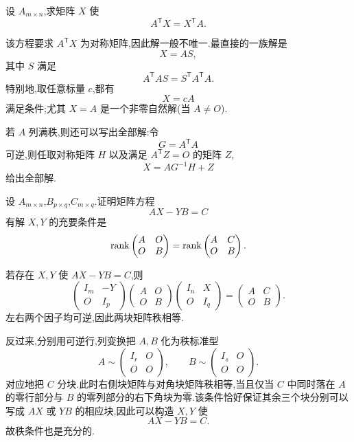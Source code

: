 \begin{example}
设 $A_{m\times n}$,求矩阵 $X$ 使
\[
A^{\mathsf T}X=X^{\mathsf T}A.
\]
\end{example}
\exampleblank

\begin{solution}
该方程要求 $A^{\mathsf T}X$ 为对称矩阵,因此解一般不唯一.最直接的一族解是
\[
\boxed{X=AS},
\]
其中 $S$ 满足
\[
A^{\mathsf T}AS=S^{\mathsf T}A^{\mathsf T}A.
\]
特别地,取任意标量 $c$,都有
\[
\boxed{X=cA}
\]
满足条件;尤其 $X=A$ 是一个非零自然解(当 $A\neq O$).

若 $A$ 列满秩,则还可以写出全部解:令
\[
G=A^{\mathsf T}A
\]
可逆,则任取对称矩阵 $H$ 以及满足 $A^{\mathsf T}Z=O$ 的矩阵 $Z$,
\[
\boxed{X=AG^{-1}H+Z}
\]
给出全部解.
\end{solution}

\begin{example}
设 $A_{m\times n}$,$B_{p\times q}$,$C_{m\times q}$.证明矩阵方程
\[
AX-YB=C
\]
有解 $X,Y$ 的充要条件是
\[
\operatorname{rank}
\begin{pmatrix}A&O\\O&B\end{pmatrix}
=
\operatorname{rank}
\begin{pmatrix}A&C\\O&B\end{pmatrix}.
\]
\end{example}
\exampleblank

\begin{solution}
若存在 $X,Y$ 使 $AX-YB=C$,则
\[
\begin{pmatrix}I_m&-Y\\O&I_p\end{pmatrix}
\begin{pmatrix}A&O\\O&B\end{pmatrix}
\begin{pmatrix}I_n&X\\O&I_q\end{pmatrix}
=
\begin{pmatrix}A&C\\O&B\end{pmatrix}.
\]
左右两个因子均可逆,因此两块矩阵秩相等.

反过来,分别用可逆行,列变换把 $A,B$ 化为秩标准型
\[
A\sim
\begin{pmatrix}I_r&O\\O&O\end{pmatrix},
\qquad
B\sim
\begin{pmatrix}I_s&O\\O&O\end{pmatrix}.
\]
对应地把 $C$ 分块.此时右侧块矩阵与对角块矩阵秩相等,当且仅当 $C$ 中同时落在 $A$ 的零行部分与 $B$ 的零列部分的右下角块为零.该条件恰好保证其余三个块分别可以写成 $AX$ 或 $YB$ 的相应块,因此可以构造 $X,Y$ 使
\[
AX-YB=C.
\]
故秩条件也是充分的.
\end{solution}


